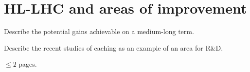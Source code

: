 \section{HL-LHC and areas of improvement}

Describe the potential gains achievable on a medium-long term.

Describe the recent studies of caching as an example of an area for
R\&D.

$\leq 2$ pages.
